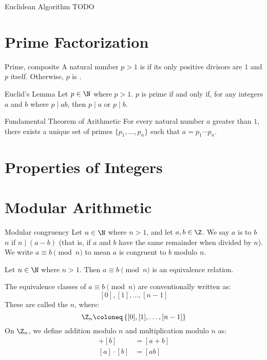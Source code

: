 \begin{thmbox}{Euclidean Algorithm}{}
    TODO
\end{thmbox}

\section{Prime Factorization}

\begin{dfnbox}{Prime, composite}{}
    A natural number $p > 1$ is  if its only positive divisors are $1$ and $p$ itself. Otherwise, $p$ is .
\end{dfnbox}

\begin{thmbox}{Euclid's Lemma}{}
    Let $p \in \N$ where $p > 1$. $p$ is prime if and only if, for any integers $a$ and $b$ where $p \mid ab$, then $p \mid a$ or $p \mid b$.
\end{thmbox}

\begin{thmbox}{Fundamental Theorem of Arithmetic}{}
    For every natural number $a$ greater than $1$, there exists a unique set of primes $\{p_1, \ldots, p_n\}$ such that $a = p_1 \cdots p_n$. 
\end{thmbox}

\section{Properties of Integers}


\section{Modular Arithmetic}

\begin{dfnbox}{Modular congruency}{}
    Let $n \in \N$ where $n > 1$, and let $a,b \in \Z$. We say $a$ is  to $b$  $n$ if $n \mid (a-b)$ (that is, if $a$ and $b$ have the same remainder when divided by $n$). We write $a \equiv b \pmod{n}$ to mean $a$ is congruent to $b$ modulo $n$.
\end{dfnbox}

\begin{thmbox}{}{}
    Let $n \in \N$ where $n > 1$. Then $a \equiv b \pmod{n}$ is an equivalence relation.
\end{thmbox}

The equivalence classes of $a \equiv b \pmod{n}$ are conventionally written as:
\[ [0], [1], \ldots, [n-1] \]
These are called the  $n$, where:
\[ \Z_n \coloneq \left\{ [0], [1], \ldots, [n - 1] \right\} \]
On $\Z_n$, we define addition modulo $n$ and multiplication modulo $n$ as:
\begin{align*}
    [a] + [b] &= [a+b] \\
    [a] \cdot [b] &= [ab]
\end{align*}

